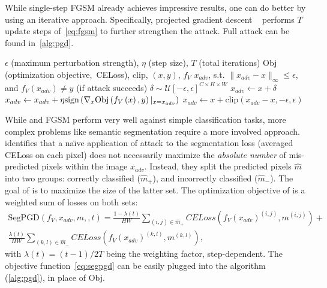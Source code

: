 While single-step FGSM already achieves impressive results, one can do better by using an iterative approach. Specifically, projected gradient descent \PGD~\cite{pgd} performs $T$ update steps of~\cref{eq:fgsm} to further strengthen the attack. Full attack can be found in~\cref{alg:pgd}.

\begin{algorithm}
\caption{PGD~\cite{pgd} algorithm.}
\label{alg:pgd}
\begin{algorithmic}
    \Require $\epsilon$ (maximum perturbation strength), $\eta$ (step size), $T$ (total iterations)
    \Require Obj (optimization objective,~\eg CELoss), clip, $(x,y)$, $f_V$
    \Ensure $x_{adv}$, s.t. $\|x_{adv}-x\|_\infty\leq\epsilon$, and $f_V(x_{adv})\neq y$ (if attack succeeds)
    \State $\delta\sim\mathcal{U}[-\epsilon, \epsilon]^{C\times H\times W}$ 
    \State $x_{adv}\gets x+\delta$ 
        \State $x_{adv}\gets x_{adv}+\eta{\text{sign}}\left(\nabla_x\text{Obj}\left(f_V\left(x\right),y\right)|_{x=x_{adv}}\right)$ 
        \State $x_{adv}\gets x+\text{clip}(x_{adv}-x,-\epsilon,\epsilon)$ 
    \EndFor
\end{algorithmic}
\end{algorithm}

While \PGD and FGSM perform very well against simple classification tasks, more complex problems like semantic segmentation require a more involved approach. \SegPGD~\cite{segpgd} identifies that a na\"{\i}ve application of \PGD attack to the segmentation loss (averaged CELoss on each pixel) does not necessarily maximize the \textit{absolute number} of mis-predicted pixels within the image $x_{adv}$. Instead, they split the predicted pixels $\hat{m}$ into two groups: correctly classified ($\hat{m}_+$), and incorrectly classified ($\hat{m}_-$). The goal of \SegPGD is to maximize the size of the latter set. The optimization objective of \SegPGD is a weighted sum of losses on both sets:
\begin{equation}
    \begin{aligned}
        \text{SegPGD}(f_V,x_{adv},m,,t)=\frac{1-\lambda(t)}{HW}\sum_{(i,j)\in \hat{m}_+}CELoss(f_V(x_{adv})^{(i,j)},m^{(i,j)})+\\
        \frac{\lambda(t)}{HW}\sum_{(k,l)\in \hat{m}_-}CELoss(f_V(x_{adv})^{(k,l)},m^{(k,l)})\text{,}
    \end{aligned}
    \label{eq:segpgd}
\end{equation}
with $\lambda(t)=(t-1)/2T$ being the weighting factor, step-dependent. The objective function~\cref{eq:segpgd} can be easily plugged into the \PGD algorithm (\cref{alg:pgd}), in place of Obj.
